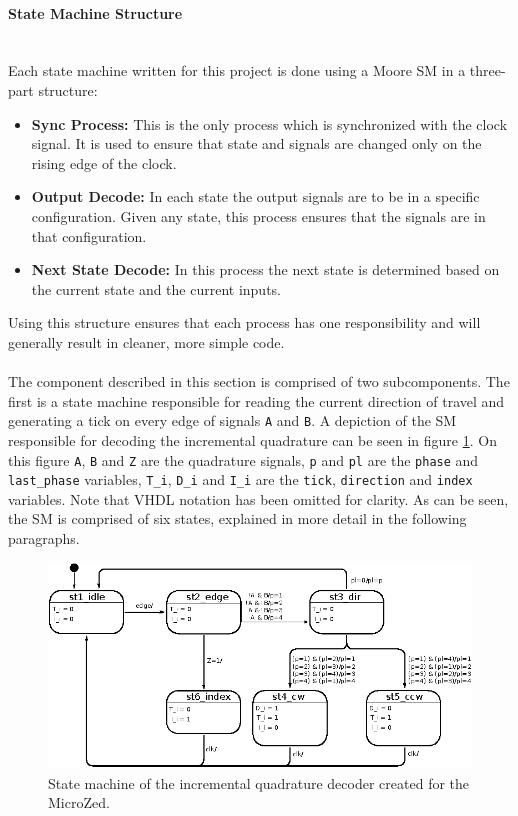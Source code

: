 \paragraph{State Machine Structure}~\\ %
\label{par:state_machine_structure}
Each state machine written for this project is done using a Moore SM in a three-part structure:
\begin{itemize}
	\item \textbf{Sync Process:} This is the only process which is synchronized with the clock signal.
	It is used to ensure that state and signals are changed only on the rising edge of the clock.
	\item \textbf{Output Decode:} In each state the output signals are to be in a specific configuration.
	Given any state, this process ensures that the signals are in that configuration.
	\item \textbf{Next State Decode:} In this process the next state is determined based on the current state and the current inputs.
\end{itemize}
Using this structure ensures that each process has one responsibility and will generally result in cleaner, more simple code.
\\~\\
The component described in this section is comprised of two subcomponents.
The first is a state machine responsible for reading the current direction of travel and generating a tick on every edge of signals \texttt{A} and \texttt{B}.
A depiction of the SM responsible for decoding the incremental quadrature can be seen in figure \ref{fig:quadstatemachine}.
On this figure \texttt{A}, \texttt{B} and \texttt{Z} are the quadrature signals, \texttt{p} and \texttt{pl} are the \texttt{phase} and \texttt{last\_phase} variables, \texttt{T\_i}, \texttt{D\_i} and \texttt{I\_i} are the \texttt{tick}, \texttt{direction} and \texttt{index} variables.
Note that VHDL notation has been omitted for clarity.
As can be seen, the SM is comprised of six states, explained in more detail in the following paragraphs.
\begin{figure}[h]
	\centering
	\includegraphics[width=.85\linewidth]{graphics/quad_state_machine}
	\caption{State machine of the incremental quadrature decoder created for the MicroZed.}
	\label{fig:quadstatemachine}
\end{figure}
